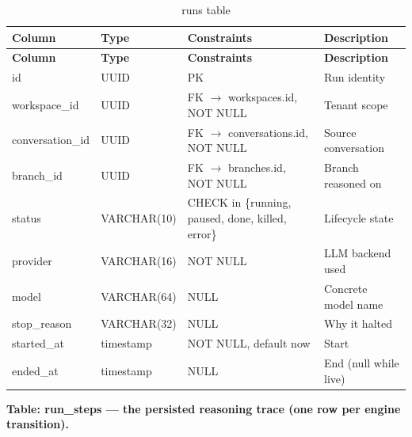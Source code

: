 \documentclass[12pt,a4paper]{report}
\begin{document}
\begingroup
\setlength{\parskip}{0pt}\renewcommand{\arraystretch}{1.32}\footnotesize
\begin{xltabular}{\textwidth}{>{\hsize\raggedright\arraybackslash}X >{\hsize\raggedright\arraybackslash}X >{\hsize\raggedright\arraybackslash}X >{\hsize\raggedright\arraybackslash}X}
\caption{runs table}\\
\toprule
\textbf{Column} & \textbf{Type} & \textbf{Constraints} & \textbf{Description} \\
\midrule\endfirsthead
\toprule
\textbf{Column} & \textbf{Type} & \textbf{Constraints} & \textbf{Description} \\
\midrule\endhead
\bottomrule\endfoot
id & UUID & PK & Run identity \\
workspace\_id & UUID & FK $\rightarrow$ workspaces.id, NOT NULL & Tenant scope \\
conversation\_id & UUID & FK $\rightarrow$ conversations.id, NOT NULL & Source conversation \\
branch\_id & UUID & FK $\rightarrow$ branches.id, NOT NULL & Branch reasoned on \\
status & VARCHAR(10) & CHECK in \{running, paused, done, killed, error\} & Lifecycle state \\
provider & VARCHAR(16) & NOT NULL & LLM backend used \\
model & VARCHAR(64) & NULL & Concrete model name \\
stop\_reason & VARCHAR(32) & NULL & Why it halted \\
started\_at & timestamp & NOT NULL, default now & Start \\
ended\_at & timestamp & NULL & End (null while live) \\
\end{xltabular}
\endgroup

\noindent\textbf{Table: run\_steps --- the persisted reasoning trace (one row per engine transition).}
\end{document}
